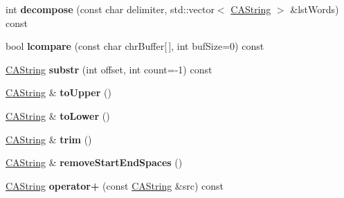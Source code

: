 \begin{DoxyCompactItemize}
\item 
\hypertarget{classps_1_1base_1_1CAString_a51f3ad8dad45d488d4d4c96133271571}{}int {\bfseries decompose} (const char delimiter, std\+::vector$<$ \hyperlink{classps_1_1base_1_1CAString}{C\+A\+String} $>$ \&lst\+Words) const \label{classps_1_1base_1_1CAString_a51f3ad8dad45d488d4d4c96133271571}

\item 
\hypertarget{classps_1_1base_1_1CAString_aeeb6fbc59f0567543b4c4dbd90be8a80}{}bool {\bfseries lcompare} (const char chr\+Buffer\mbox{[}$\,$\mbox{]}, int buf\+Size=0) const \label{classps_1_1base_1_1CAString_aeeb6fbc59f0567543b4c4dbd90be8a80}

\item 
\hypertarget{classps_1_1base_1_1CAString_a938de78124daf55637338f4fcddad31f}{}\hyperlink{classps_1_1base_1_1CAString}{C\+A\+String} {\bfseries substr} (int offset, int count=-\/1) const \label{classps_1_1base_1_1CAString_a938de78124daf55637338f4fcddad31f}

\item 
\hypertarget{classps_1_1base_1_1CAString_acfea142771eb720a0e2433d6e535c56c}{}\hyperlink{classps_1_1base_1_1CAString}{C\+A\+String} \& {\bfseries to\+Upper} ()\label{classps_1_1base_1_1CAString_acfea142771eb720a0e2433d6e535c56c}

\item 
\hypertarget{classps_1_1base_1_1CAString_a40a873d428d0fb836d50c6c4f07859c5}{}\hyperlink{classps_1_1base_1_1CAString}{C\+A\+String} \& {\bfseries to\+Lower} ()\label{classps_1_1base_1_1CAString_a40a873d428d0fb836d50c6c4f07859c5}

\item 
\hypertarget{classps_1_1base_1_1CAString_a9ce1f921f381bc9f3b2cae03d876465d}{}\hyperlink{classps_1_1base_1_1CAString}{C\+A\+String} \& {\bfseries trim} ()\label{classps_1_1base_1_1CAString_a9ce1f921f381bc9f3b2cae03d876465d}

\item 
\hypertarget{classps_1_1base_1_1CAString_aa0cea8163cd952290ee47c803ce2fb07}{}\hyperlink{classps_1_1base_1_1CAString}{C\+A\+String} \& {\bfseries remove\+Start\+End\+Spaces} ()\label{classps_1_1base_1_1CAString_aa0cea8163cd952290ee47c803ce2fb07}

\item 
\hypertarget{classps_1_1base_1_1CAString_a2f0ce5937bb70b929d08d0ad4bff545e}{}\hyperlink{classps_1_1base_1_1CAString}{C\+A\+String} {\bfseries operator+} (const \hyperlink{classps_1_1base_1_1CAString}{C\+A\+String} \&src) const \label{classps_1_1base_1_1CAString_a2f0ce5937bb70b929d08d0ad4bff545e}


\end{DoxyCompactItemize}
